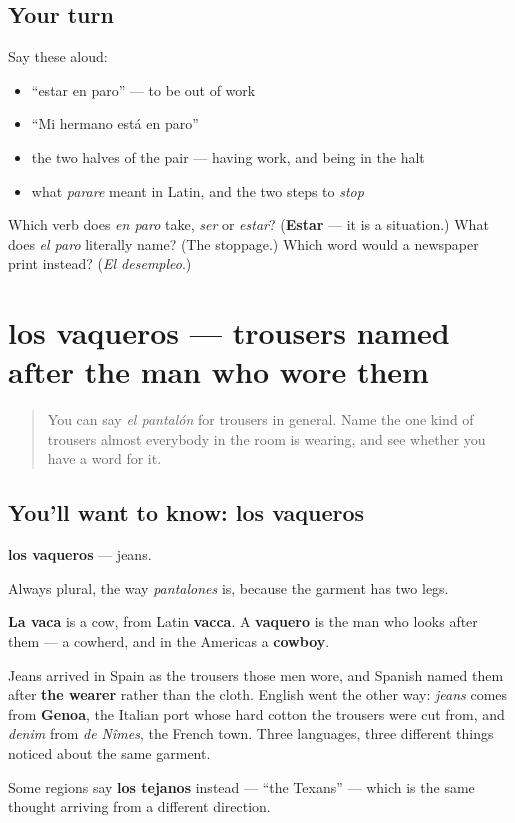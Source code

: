 \subsection*{Your turn}
Say these aloud:

\begin{itemize}
\raggedright
  \item \textquotedblleft{}estar en paro\textquotedblright{} — to be out of work
  \item \textquotedblleft{}Mi hermano está en paro\textquotedblright{}
  \item the two halves of the pair — having work, and being in the halt
  \item what \emph{parare} meant in Latin, and the two steps to \emph{stop}
\end{itemize}

\begin{tcolorbox}[breakable,colback=teal!4,colframe=teal!35!black,title={Before you move on}]
Which verb does \emph{en paro} take, \emph{ser} or \emph{estar}? (\textbf{Estar} — it is a situation.) What does \emph{el paro} literally name? (The stoppage.) Which word would a newspaper print instead? (\emph{El desempleo}.)
\end{tcolorbox}
\section[los vaqueros]{los vaqueros — trousers named after the man who wore them}

\label{lesson:ES-C430-vaqueros}



\begin{quote}
You can say \emph{el pantalón} for trousers in general. Name the one kind of trousers almost everybody in the room is wearing, and see whether you have a word for it.
\end{quote}

\subsection*{You'll want to know: los vaqueros}
\textbf{los vaqueros} — jeans.

Always plural, the way \emph{pantalones} is, because the garment has two legs.

\begin{cousinweb}
\textbf{La vaca} is a cow, from Latin \textbf{vacca}. A \textbf{vaquero} is the man who looks after them — a cowherd, and in the Americas a \textbf{cowboy}.

Jeans arrived in Spain as the trousers those men wore, and Spanish named them after \textbf{the wearer} rather than the cloth. English went the other way: \emph{jeans} comes from \textbf{Genoa}, the Italian port whose hard cotton the trousers were cut from, and \emph{denim} from \emph{de Nîmes}, the French town. Three languages, three different things noticed about the same garment.

Some regions say \textbf{los tejanos} instead — \textquotedblleft{}the Texans\textquotedblright{} — which is the same thought arriving from a different direction.
\end{cousinweb}

